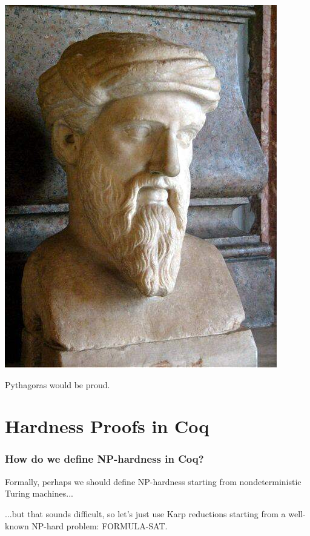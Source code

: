 \documentclass{beamer}
\begin{document}
\begin{frame}
  \centering
  \includegraphics[height=0.7\textheight]{pythagoras}
  \par
  \vspace{4ex}
  Pythagoras would be proud.
\end{frame}

\section{Hardness Proofs in Coq}

\begin{frame}
  \frametitle{How do we define NP-hardness in Coq?}

  Formally, perhaps we should define NP-hardness starting from nondeterministic Turing machines...

  \pause
  \vspace{5ex}

  ...but that sounds difficult, so let's just use Karp reductions starting from a well-known NP-hard problem: FORMULA-SAT.
\end{frame}
\end{document}
